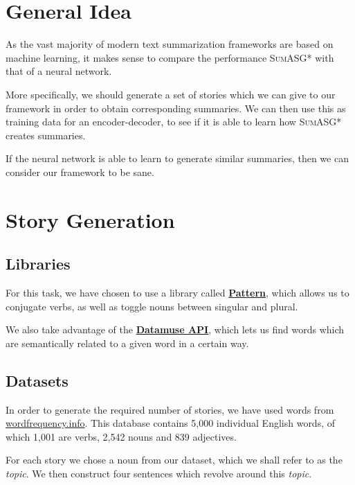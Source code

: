 \label{chapter:evaluation}

\section{General Idea}

As the vast majority of modern text summarization frameworks are based on machine learning, it makes sense to compare the performance \textsc{SumASG*} with that of a neural network.

More specifically, we should generate a set of stories which we can give to our framework in order to obtain corresponding summaries. We can then use this as training data for an encoder-decoder, to see if it is able to learn how \textsc{SumASG*} creates summaries.

If the neural network is able to learn to generate similar summaries, then we can consider our framework to be sane.

\section{Story Generation}

\subsection{Libraries}

For this task, we have chosen to use a library called \textbf{\href{http://web.archive.org/web/20190516161631/https://www.clips.uantwerpen.be/pages/pattern-en}{Pattern}}, which allows us to conjugate verbs, as well as toggle nouns between singular and plural.

We also take advantage of the \textbf{\href{https://www.datamuse.com/api/}{Datamuse API}}, which lets us find words which are semantically related to a given word in a certain way.

\subsection{Datasets}

In order to generate the required number of stories, we have used words from \href{http://www.wordfrequency.info/}{wordfrequency.info}. This database contains 5,000 individual English words, of which 1,001 are verbs, 2,542 nouns and 839 adjectives.

For each story we chose a noun from our dataset, which we shall refer to as the \textit{topic}. We then construct four sentences which revolve around this \textit{topic}.

